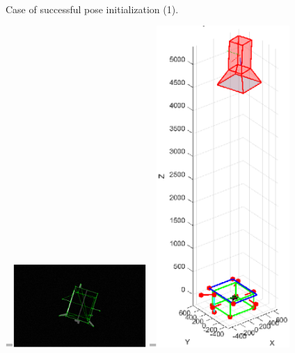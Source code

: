\begin{figure}[htpb]
  {\,}
  \caption{Case of successful pose initialization (1).}
  \label{fig:EVVAI1}
\end{figure}

\begin{figure}[htpb]
  =\hbox{\includegraphics[width=0.45\textwidth]{gfx/PoseDetermination/trial214modelMap.eps}}%
  =\hbox{\includegraphics[width=0.45\textwidth]{gfx/PoseDetermination/cameraWRTSC214.eps}}%
  {\,} \hfill
   \hfill

\end{figure}
